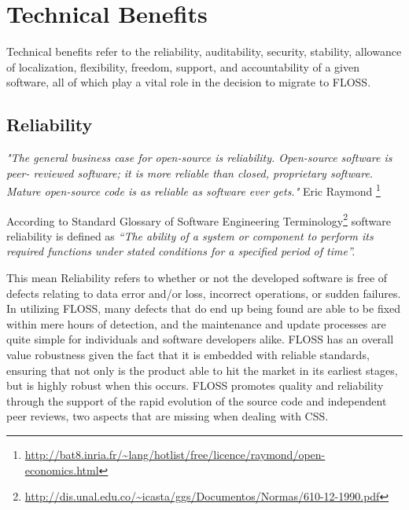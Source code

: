  \section{Technical  Benefits}
 Technical benefits refer to the reliability, auditability, security, stability, allowance of localization, flexibility, freedom, support, and accountability of a given software, all of which play a vital role in the decision to migrate to FLOSS.


 \subsection {Reliability}
 \textit{ "The general business case for open-source is reliability. Open-source software is peer- reviewed software; it is more reliable than closed, proprietary software. Mature open-source code is as reliable as software ever gets."}
  Eric Raymond \footnote{\url{http://bat8.inria.fr/~lang/hotlist/free/licence/raymond/open-economics.html}}

 According to Standard Glossary of Software Engineering Terminology\footnote{ \url {http://dis.unal.edu.co/~icasta/ggs/Documentos/Normas/610-12-1990.pdf}} software reliability is defined as \textit{“The ability of a system or component to perform its required functions under stated conditions for a specified period of time”.}

 This mean Reliability refers to whether or not the developed software is free of defects relating to data error and/or loss, incorrect operations, or sudden failures. In utilizing FLOSS, many defects that do end up being found are able to be fixed within mere hours of detection, and the maintenance and update processes are quite simple for individuals and software developers alike. FLOSS has an overall value robustness given the fact that it is embedded with reliable standards, ensuring that not only is the product able to hit the market in its earliest stages, but is highly robust when this occurs. FLOSS promotes quality and reliability through the support of the rapid evolution of the source code and independent peer reviews, two aspects that are missing when dealing with CSS.


